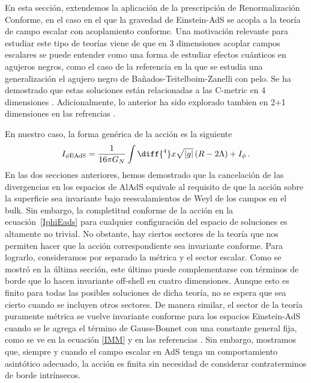 \documentclass[../Main.tex]{subfiles}
\begin{document}
En esta sección, extendemos la aplicación de la prescripción de Renormalización Conforme, en el caso en el que la gravedad de Einstein-AdS se acopla a la teoría de campo escalar con acoplamiento conforme. Una motivación relevante para estudiar este tipo de teorías viene de que en 3 dimensiones acoplar campos escalares se puede entender como una forma de estudiar efectos cuánticos en agujeros negros, como el caso de la referencia \cite{Martinez:1996gn,Casals:2016odj} en la que se estudia una generalización el agujero negro de Bañados-Teitelboim-Zanelli con pelo. Se ha demostrado que estas soluciones están relacionadas a las C-metric en 4 dimensiones \cite{Emparan:2020znc}. Adicionalmente, lo anterior ha sido explorado tambien en 2+1 dimensiones en las refrencias \cite{Arenas-Henriquez:2022www,Arenas-Henriquez:2023hur,Cisterna:2023qhh}.

En nuestro caso, la forma genérica de la acción es la siguiente
\begin{equation}
I_{\phi \rm EAdS} = \frac{1}{16 \pi G_{N}} \int \diff{^4}x\sqrt{|g|} \left(R-2 \Lambda\right) + I_{\phi} \, .
\label{IphiEads}
\end{equation}
En las dos secciones anteriores, hemos demostrado que la cancelación de las divergencias en los espacios de AlAdS equivale al requisito de que la acción sobre la superficie sea invariante bajo reescalamientos de Weyl de los campos en el bulk. Sin embargo, la completitud conforme de la acción en la ecuación~\eqref{IphiEads} para cualquier configuración del espacio de soluciones es altamente no trivial. No obstante, hay ciertos sectores de la teoría que nos permiten hacer que la acción correspondiente sea invariante conforme. Para lograrlo, consideramos por separado la métrica y el sector escalar. Como se mostró en la última sección, este último puede complementarse con términos de borde que lo hacen invariante off-shell en cuatro dimensiones. Aunque esto es finito para todas las posibles soluciones de dicha teoría, no se espera que sea cierto cuando se incluyen otros sectores. De manera similar, el sector de la teoría puramente métrica se vuelve invariante conforme para los espacios Einstein-AdS cuando se le agrega el término de Gauss-Bonnet con una constante general fija, como se ve en la ecuación \eqref{IMM} y en las referencias \cite{Maldacena:2011mk,Anastasiou:2016jix}. Sin embargo, mostramos que, siempre y cuando el campo escalar en AdS tenga un comportamiento asintótico adecuado, la acción es finita sin necesidad de considerar contraterminos de borde intrínsecos.
\end{document}
